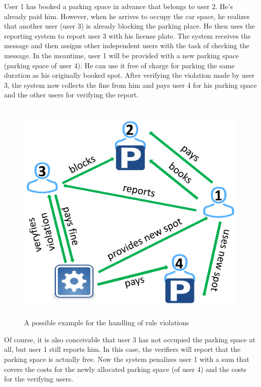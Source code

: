 \documentclass[
a4paper,     %
titlepage,   %
14pt         %
]{scrartcl}  %
\theoremstyle{mystyle}
\begin{document}
User 1 has booked a parking space in advance that belongs to user 2. He's already paid him. However, when he arrives to occupy the car space, he realizes that another user (user 3) is already blocking the parking place. He then uses the reporting system to report user 3 with his license plate. The system receives the message and then assigns other independent users with the task of checking the message. In the meantime, user 1 will be provided with a new parking space (parking space of user 4). He can use it free of charge for parking the same duration as his originally booked spot. After verifying the violation made by user 3, the system now collects the fine from him and pays user 4 for his parking space and the other users for verifying the report.\\

\begin{figure}
	\centering
	\includegraphics[width=13cm,height=11cm]{example_grafik.pdf}
	\caption{A possible example for the handling of rule violations}
	\label{img:example-grafik}
\end{figure}
 
Of course, it is also conceivable that user 3 has not occupied the parking space at all, but user 1 still reports him. In this case, the verifiers will report that the parking space is actually free. Now the system penalizes user 1 with a sum that covers the costs for the newly allocated parking space (of user 4) and the costs for the verifying users.\\
\end{document}

